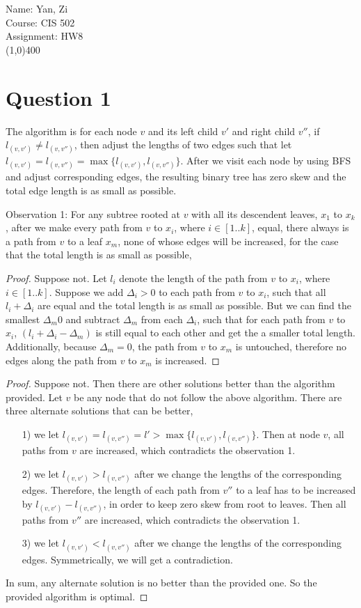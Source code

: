 \documentclass[letter,12pt]{article}
\begin{document}
Name: Yan, Zi \\
Course: CIS 502 \\
Assignment: HW8 \\
\line(1,0){400}
\section*{Question 1}
The algorithm is for each node $v$ and its left child $v'$ and right child $v''$,
if $l_{(v,v')} \neq l_{(v, v'')}$, then adjust the lengths of two edges such that
let $l_{(v,v')} = l_{(v, v'')} = \max\{l_{(v,v')}, l_{(v, v'')}\}$. After we visit each node
by using BFS and adjust corresponding edges, the resulting binary tree has
zero skew and the total edge length is as small as possible.

Observation 1: For any subtree rooted at $v$ with all its descendent leaves, $x_1$ to 
$x_k$, after we make every path from $v$ to $x_i$, where $i \in [1..k]$, equal, there 
always is a path from $v$ to a leaf $x_m$, none of whose edges will be increased, for
the case that the total length is as small as possible,
\begin{proof}
Suppose not. Let $l_i$ denote the length of the path from $v$ to $x_i$, where $i \in 
[1..k]$. Suppose we add $\Delta_i>0$ to each path from $v$ to $x_i$, such that all 
$l_i+\Delta_i$ are equal and the total length is as small as possible. But we can find the 
smallest $\Delta_m0$ and subtract $\Delta_m$ from each $\Delta_i$, such that for 
each path from $v$ to $x_i$, $(l_i+\Delta_i-\Delta_m)$ is still equal to each other and 
get the a smaller total length. Additionally, because $\Delta_m = 0$, the path from 
$v$ to $x_m$ is untouched, therefore no edges along the path from $v$ to $x_m$ is 
increased. 
\end{proof}
\begin{proof}
Suppose not. Then there are other solutions better than the algorithm provided.
Let $v$ be any node that do not follow the above algorithm.
There are three alternate solutions that can be better, 
\begin{itemize}
    \item[1)] we let $l_{(v,v')} = l_{(v, v'')} = l' >  \max\{l_{(v,v')}, l_{(v, v'')}\}$. Then at
    node $v$, all paths from $v$ are increased, which contradicts the observation 1.
    \item[2)] we let $l_{(v,v')} > l_{(v, v'')}$ after we change the lengths of the 
    corresponding edges. Therefore, the length of each path from $v''$ to a leaf has to 
    be increased by $l_{(v,v')} - l_{(v, v'')}$, in order to keep zero skew from root to 
    leaves. Then all paths from $v''$ are increased, which contradicts the observation 1.
    \item[3)] we let $l_{(v,v')} < l_{(v, v'')}$ after we change the lengths of the 
    corresponding edges. Symmetrically, we will get a contradiction.
\end{itemize}
In sum, any alternate solution is no better than the provided one. So the provided
algorithm is optimal.
\end{proof}
\end{document}
